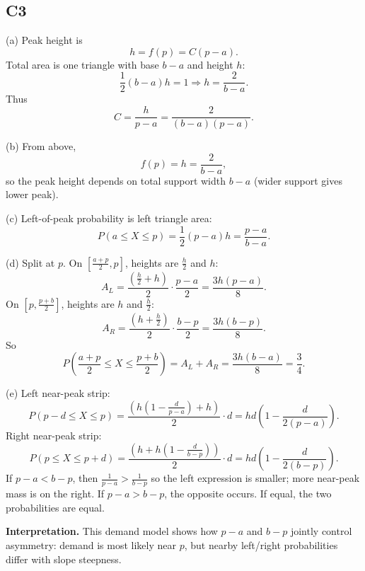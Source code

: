 \subsection*{C3}
(a) Peak height is
\[
h=f(p)=C(p-a).
\]
Total area is one triangle with base $b-a$ and height $h$:
\[
\frac12(b-a)h=1
\Rightarrow
h=\frac{2}{b-a}.
\]
Thus
\[
C=\frac{h}{p-a}=\frac{2}{(b-a)(p-a)}.
\]

(b) From above,
\[
f(p)=h=\frac{2}{b-a},
\]
so the peak height depends on total support width $b-a$ (wider support gives lower peak).

(c) Left-of-peak probability is left triangle area:
\[
P(a\le X\le p)=\frac12(p-a)h=\frac{p-a}{b-a}.
\]

(d) Split at $p$.
On $\left[\frac{a+p}{2},p\right]$, heights are $\frac h2$ and $h$:
\[
A_L=\frac{\left(\frac h2+h\right)}{2}\cdot\frac{p-a}{2}=\frac{3h(p-a)}{8}.
\]
On $\left[p,\frac{p+b}{2}\right]$, heights are $h$ and $\frac h2$:
\[
A_R=\frac{\left(h+\frac h2\right)}{2}\cdot\frac{b-p}{2}=\frac{3h(b-p)}{8}.
\]
So
\[
P\!\left(\frac{a+p}{2}\le X\le\frac{p+b}{2}\right)=A_L+A_R=\frac{3h(b-a)}{8}=\frac34.
\]

(e) Left near-peak strip:
\[
P(p-d\le X\le p)=\frac{\left(h\left(1-\frac{d}{p-a}\right)+h\right)}{2}\cdot d
=hd\left(1-\frac{d}{2(p-a)}\right).
\]
Right near-peak strip:
\[
P(p\le X\le p+d)=\frac{\left(h+h\left(1-\frac{d}{b-p}\right)\right)}{2}\cdot d
=hd\left(1-\frac{d}{2(b-p)}\right).
\]
If $p-a<b-p$, then $\frac{1}{p-a}>\frac{1}{b-p}$ so the left expression is smaller; more near-peak mass is on the right. If $p-a>b-p$, the opposite occurs. If equal, the two probabilities are equal.

\textbf{Interpretation.}
This demand model shows how $p-a$ and $b-p$ jointly control asymmetry: demand is most likely near $p$, but nearby left/right probabilities differ with slope steepness.


